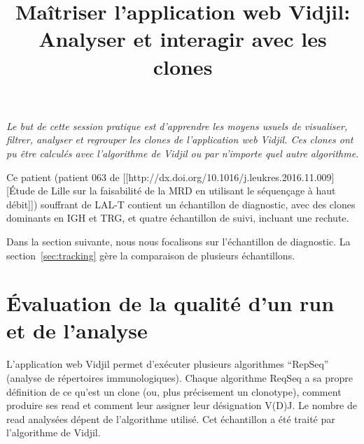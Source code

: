 \documentclass[11pt]{article}
\title{Maîtriser l'application web Vidjil:\\ Analyser et interagir avec les
clones}
\begin{document}
\maketitle

\textit{Le but de cette session pratique est d'apprendre les moyens usuels de
  visualiser, filtrer, analyser et regrouper les clones de l'application web
  Vidjil.
%
Ces clones ont pu être calculés avec l'algorithme de Vidjil ou par n'importe
quel autre algorithme.}

\bigskip


Ce patient (patient 063 de [[http://dx.doi.org/10.1016/j.leukres.2016.11.009][Étude de Lille sur la faisabilité de la MRD en utilisant le séquençage à haut débit]])
souffrant de LAL-T contient un échantillon de diagnostic,
avec des clones dominants en IGH et TRG,
et quatre échantillon de suivi, incluant une rechute.


Dans la section suivante, nous nous focalisons sur l'échantillon de diagnostic.
La section~\ref{sec:tracking} gère la comparaison de plusieurs échantillons.



\section{Évaluation de la qualité d'un run et de l'analyse}
L'application web Vidjil permet d'exécuter plusieurs algorithmes ``RepSeq'' (analyse de répertoires immunologiques).
Chaque algorithme ReqSeq a sa propre définition de ce qu'est un clone
(ou, plus précisement un clonotype),
comment produire ses read et comment leur assigner leur désignation V(D)J.
Le nombre de read analysées dépent de l'algorithme utilisé.
Cet échantillon a été traité par l'algorithme de Vidjil.


\end{document}
